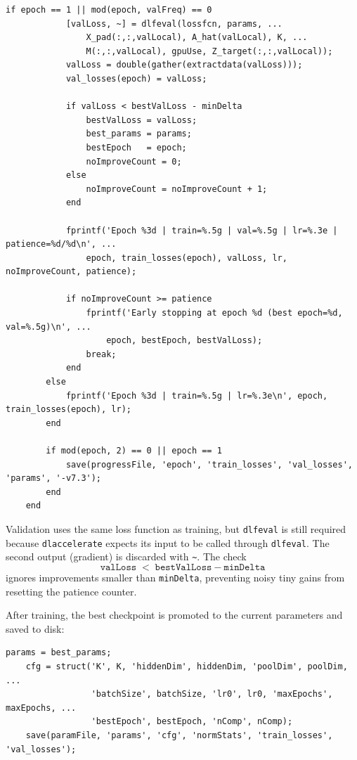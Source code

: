\documentclass[11pt]{article}
\begin{document}
\begin{lstlisting}[caption={Validation pass and early-stopping logic}]
        if epoch == 1 || mod(epoch, valFreq) == 0
            [valLoss, ~] = dlfeval(lossfcn, params, ...
                X_pad(:,:,valLocal), A_hat(valLocal), K, ...
                M(:,:,valLocal), gpuUse, Z_target(:,:,valLocal));
            valLoss = double(gather(extractdata(valLoss)));
            val_losses(epoch) = valLoss;

            if valLoss < bestValLoss - minDelta
                bestValLoss = valLoss;
                best_params = params;
                bestEpoch   = epoch;
                noImproveCount = 0;
            else
                noImproveCount = noImproveCount + 1;
            end

            fprintf('Epoch %3d | train=%.5g | val=%.5g | lr=%.3e | patience=%d/%d\n', ...
                epoch, train_losses(epoch), valLoss, lr, noImproveCount, patience);

            if noImproveCount >= patience
                fprintf('Early stopping at epoch %d (best epoch=%d, val=%.5g)\n', ...
                    epoch, bestEpoch, bestValLoss);
                break;
            end
        else
            fprintf('Epoch %3d | train=%.5g | lr=%.3e\n', epoch, train_losses(epoch), lr);
        end

        if mod(epoch, 2) == 0 || epoch == 1
            save(progressFile, 'epoch', 'train_losses', 'val_losses', 'params', '-v7.3');
        end
    end
\end{lstlisting}

Validation uses the same loss function as training, but \texttt{dlfeval} is
still required because \texttt{dlaccelerate} expects its input to be called
through \texttt{dlfeval}. The second output (gradient) is discarded with
\texttt{\~}. The check
\[
  \texttt{valLoss} \;<\; \texttt{bestValLoss} - \texttt{minDelta}
\]
ignores improvements smaller than \texttt{minDelta}, preventing noisy tiny
gains from resetting the patience counter.

After training, the best checkpoint is promoted to the current parameters
and saved to disk:

\begin{lstlisting}[caption={Final save}]
    params = best_params;
    cfg = struct('K', K, 'hiddenDim', hiddenDim, 'poolDim', poolDim, ...
                 'batchSize', batchSize, 'lr0', lr0, 'maxEpochs', maxEpochs, ...
                 'bestEpoch', bestEpoch, 'nComp', nComp);
    save(paramFile, 'params', 'cfg', 'normStats', 'train_losses', 'val_losses');
\end{lstlisting}
\end{document}
